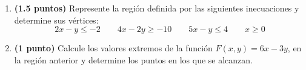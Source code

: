 
\begin{enumerate}[label=\alph*)]
\item \textbf{(1.5 puntos)} Represente la región definida por las siguientes inecuaciones y determine sus vértices:
\[
2x-y\leq-2\qquad4x-2y\geq-10\qquad5x-y\leq4\qquad x\geq0
\]
\item \textbf{(1 punto)} Calcule los valores extremos de la función $F(x,y)=6x-3y$, en la región anterior y determine los puntos en los que se alcanzan.
\end{enumerate}

